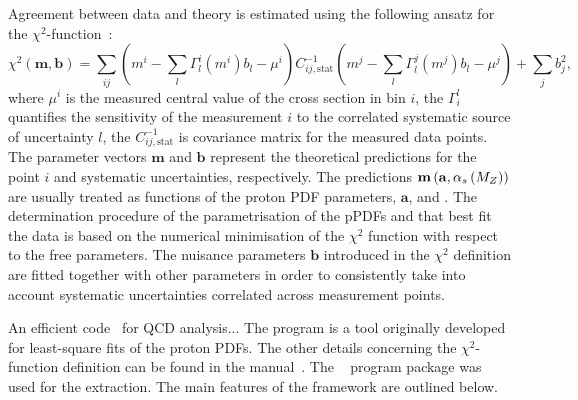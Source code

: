 Agreement between data and theory is estimated using the following ansatz for the $\chi^2$-function~\cite{Aaron:2009aa}:
\begin{equation}
 \chi^2\left( \mathbf{m},\mathbf{b}\right) = \sum_{ij}{\left( m^i -\sum_{l}{\Gamma_l^i\left( m^i\right)b_l - \mu^i }\right) C^{-1}_{ij,\text{stat}} \left( m^j -\sum_{l}{\Gamma_l^j\left( m^j\right)b_l - \mu^j }\right) } + \sum_{j}{b_j^2},
 \label{eq:chi2corr}
\end{equation}
where $\mu^i$ is the measured central value of the cross section in bin $i$, the $\Gamma_i^l$ quantifies the sensitivity of the measurement $i$ to the correlated systematic source of uncertainty $l$, the $C^{-1}_{ij,\text{stat}}$ is covariance matrix for the measured data points. The parameter vectors $\mathbf{m}$ and $\mathbf{b}$ represent the theoretical predictions for the point $i$ and systematic uncertainties, respectively. The predictions $\mathbf{m}\left( \mathbf{a},\mbox{$\alpha_{s}\left(M_{Z}\right)$}\right)$ are usually treated as functions of the proton PDF parameters, $\mathbf{a}$,  and \asz. The determination procedure of the parametrisation of the pPDFs and \as that best fit the data is based on the numerical minimisation of the $\chi^2$ function with respect to the free parameters. The nuisance parameters $\mathbf{b}$ introduced in the $\chi^2$ definition are fitted together with other parameters in order to consistently take into account systematic uncertainties correlated across measurement points.

An efficient code~\cite{herafitter} for QCD analysis...  The \herafitter program is a tool originally developed for least-square fits of the proton PDFs. The other details concerning the $\chi^2$-function definition can be found in the \herafitter manual~\cite{herafitter:2014:manual}. The \herafitter~\cite{Aaron:2009aa,Aaron:2009kv} program package was used for the \as extraction. The main features of the \herafitter framework are outlined below.

